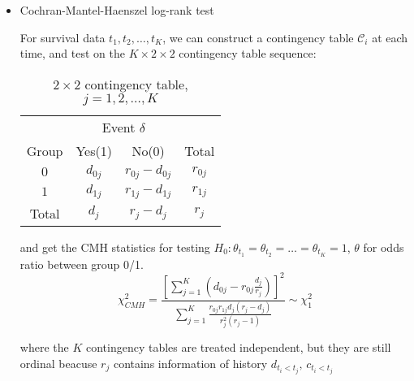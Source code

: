 \begin{itemize}[topsep=2pt,itemsep=0pt]
    \item Cochran-Mantel-Haenszel log-rank test
    
    For survival data $ t_1,t_2,\ldots,t_K $, we can construct a contingency table $ \mathcal{C}_i $ at each time, and test on the $ K\times 2\times 2 $ contingency table sequence:

    \begin{table}[H]
        \centering
        \renewcommand\arraystretch{1}
        \caption{$ 2\times 2 $ contingency table, $ j=1,2,\ldots,K $}
        \begin{tabular}{cccc}
            \hline
            \hline
            &\multicolumn{2}{c}{Event $ \delta  $}&\\
            \cline{2-3}
            Group&Yes(1)&No(0)&Total\\
            \hline
            $ 0 $&$ d_{0j} $&$ r_{0j}-d_{0j} $&$ r_{0j} $\\
            $ 1 $&$ d_{1j} $&$ r_{1j}-d_{1j} $&$ r_{1j} $\\
            \hline
            Total&$ d_j $&$ r_j-d_j $&$ r_j $\\
            \hline
            \hline
        \end{tabular}
        \label{}
    \end{table}

    and get the CMH statistics for testing $ H_0:\theta _{t_1}=\theta _{t_2}=\ldots =\theta _{t_K} =1$, $ \theta  $ for odds ratio between group 0/1.
    \begin{equation}
        \chi^2 _{CMH}=\dfrac{\left[ \sum_{j=1}^K (d_{0j}-r_{0j}\frac{d_j}{r_j}) \right]^2 }{\sum_{j=1}^K \frac{r_{0j}r_{1j}d_j(r_j-d_j)}{r_j^2(r_j-1)}}\sim \chi^2_1
    \end{equation}

    where the $ K $ contingency tables are treated independent, but they are still ordinal beacuse $ r_{j} $ contains information of history $ d_{t_i<t_j},\, c_{t_i<t_j} $
\end{itemize}

